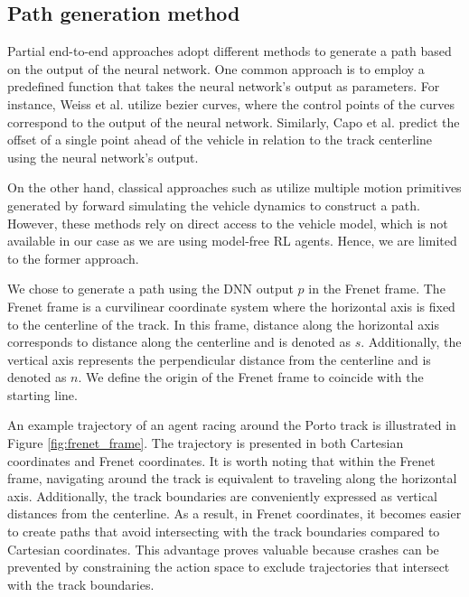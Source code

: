 \subsection{Path generation method}\label{sec:path_construction}

Partial end-to-end approaches adopt different methods to generate a path based on the output of the neural network. 
One common approach is to employ a predefined function that takes the neural network's output as parameters. 
For instance, Weiss et al. \cite{Weiss2020a} utilize bezier curves, where the control points of the curves correspond to the output of the neural network. 
Similarly, Capo et al. \cite{Capo2020} predict the offset of a single point ahead of the vehicle in relation to the track centerline using the neural network's output.

On the other hand, classical approaches such as \cite{keefer2022, Liniger2015a, Wang2021} utilize multiple motion primitives generated by forward simulating the vehicle dynamics to construct a path. 
However, these methods rely on direct access to the vehicle model, which is not available in our case as we are using model-free RL agents.
Hence, we are limited to the former approach.


We chose to generate a path using the DNN output $p$ in the Frenet frame.
The Frenet frame is a curvilinear coordinate system where the horizontal axis is fixed to the centerline of the track. 
In this frame, distance along the horizontal axis corresponds to distance along the centerline and is denoted as $s$. 
Additionally, the vertical axis represents the perpendicular distance from the centerline and is denoted as $n$.
We define the origin of the Frenet frame to coincide with the starting line.


An example trajectory of an agent racing around the Porto track is illustrated in Figure \ref{fig:frenet_frame}. 
The trajectory is presented in both Cartesian coordinates and Frenet coordinates. 
It is worth noting that within the Frenet frame, navigating around the track is equivalent to traveling along the horizontal axis. 
Additionally, the track boundaries are conveniently expressed as vertical distances from the centerline. 
As a result, in Frenet coordinates, it becomes easier to create paths that avoid intersecting with the track boundaries compared to Cartesian coordinates. 
This advantage proves valuable because crashes can be prevented by constraining the action space to exclude trajectories that intersect with the track boundaries.

